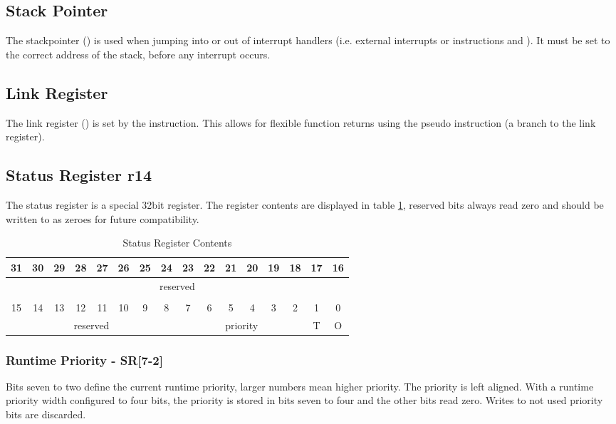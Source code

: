 \subsection{Stack Pointer}
The stackpointer () is used when jumping into or out of interrupt handlers (i.e. external interrupts or  instructions and ).
It must be set to the correct address of the stack, before any interrupt occurs.
\subsection{Link Register}
The link register () is set by the  instruction.
This allows for flexible function returns using the pseudo instruction  (a branch to the link register).
\subsection{Status Register r14}
The status register is a special 32bit register.
The register contents are displayed in table \ref{tbl:SR}, reserved bits always read zero and should be written to as zeroes for future compatibility.
\begin{table}
\center
\begin{tabular}{|c|c|c|c|c|c|c|c|c|c|c|c|c|c|c|c|}
\hline 
31 & 30 & 29 & 28 & 27 & 26 & 25 & 24 & 23 & 22 & 21 & 20 & 19 & 18 & 17 & 16\\ 
\hline 
\multicolumn{16}{|c|}{reserved}\\
\hline
\multicolumn{16}{c}{}\\
\hline 
15 & 14 & 13 & 12 & 11 & 10 & 9 & 8 & 7 & 6 & 5 & 4 & 3 & 2 & 1 & 0 \\
\hline 
\multicolumn{8}{|c|}{reserved} & \multicolumn{6}{|c|}{priority} & T & O \\
\hline
\end{tabular}
\caption{Status Register Contents}
\label{tbl:SR}
\end{table}

\subsubsection{Runtime Priority - SR[7-2]}
Bits seven to two define the current runtime priority, larger numbers mean higher priority. The priority is left aligned.
With a runtime priority width configured to four bits, the priority is stored in bits seven to four and the other bits read zero.
Writes to not used priority bits are discarded.

